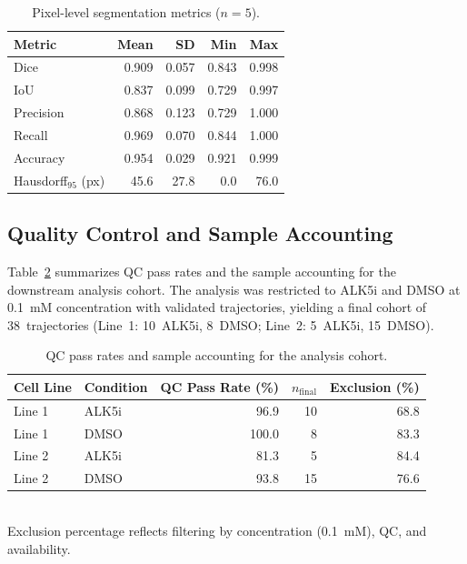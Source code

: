 \begin{table}[t]
  \centering
  \caption{Pixel-level segmentation metrics ($n = 5$).}\label{tab:dice}
  \begin{tabular}{lrrrr}
    \toprule
    Metric & Mean & SD & Min & Max \\
    \midrule
    Dice       & 0.909 & 0.057 & 0.843 & 0.998 \\
    IoU        & 0.837 & 0.099 & 0.729 & 0.997 \\
    Precision  & 0.868 & 0.123 & 0.729 & 1.000 \\
    Recall     & 0.969 & 0.070 & 0.844 & 1.000 \\
    Accuracy   & 0.954 & 0.029 & 0.921 & 0.999 \\
    Hausdorff$_{95}$ (px) & 45.6 & 27.8 & 0.0 & 76.0 \\
    \bottomrule
  \end{tabular}
\end{table}

\subsection{Quality Control and Sample Accounting}

Table~\ref{tab:qc_pass} summarizes QC pass rates and the sample accounting for the downstream analysis cohort. The analysis was restricted to ALK5i and DMSO at 0.1~mM concentration with validated trajectories, yielding a final cohort of 38~trajectories (Line~1: 10~ALK5i, 8~DMSO; Line~2: 5~ALK5i, 15~DMSO).

\begin{table}[t]
  \centering
  \caption{QC pass rates and sample accounting for the analysis cohort.}\label{tab:qc_pass}
  \begin{tabular}{llrrr}
    \toprule
    Cell Line & Condition & QC Pass Rate (\%) & $n_\text{final}$ & Exclusion (\%) \\
    \midrule
    Line 1 & ALK5i & 96.9 & 10 & 68.8 \\
    Line 1 & DMSO  & 100.0 & 8  & 83.3 \\
    Line 2 & ALK5i & 81.3  & 5  & 84.4 \\
    Line 2 & DMSO  & 93.8  & 15 & 76.6 \\
    \bottomrule
  \end{tabular}
  \smallskip\\
  {\small Exclusion percentage reflects filtering by concentration (0.1~mM), QC, and availability.}
\end{table}


